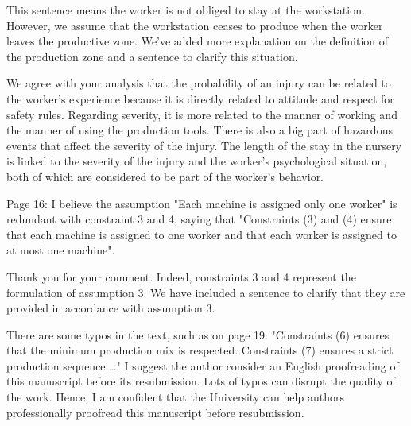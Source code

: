 \documentclass[preprint,11pt,3p]{elsarticle}
\begin{document}
\begin{tcolorbox}[colback=r_color1,colframe=r_color2,title=R5:]
This sentence means the worker is not obliged to stay at the workstation. However, we assume that the workstation ceases to produce when the worker leaves the productive zone. We've added more explanation on the definition of the production zone and a sentence to clarify this situation. 

We agree with your analysis that the probability of an injury can be related to the worker's experience because it is directly related to attitude and respect for safety rules. Regarding severity, it is more related to the manner of working and the manner of using the production tools. There is also a big part of hazardous events that affect the severity of the injury. The length of the stay in the nursery is linked to the severity of the injury and the worker's psychological situation, both of which are considered to be part of the worker's behavior.  


\end{tcolorbox}
\begin{tcolorbox}[colback=q_color1,colframe=q_color2,title=Q6  :] Page 16: I believe the assumption "Each machine is assigned only one worker" is redundant with constraint 3 and 4, saying that "Constraints (3) and (4) ensure that each machine is assigned to one worker and that each worker is assigned to at most one machine".
\end{tcolorbox}

\begin{tcolorbox}[colback=r_color1,colframe=r_color2,title=R6:]
Thank you for your comment. Indeed, constraints 3 and 4 represent the formulation of assumption 3. We have included a sentence to clarify that they are provided in accordance with assumption 3.

\end{tcolorbox}
\begin{tcolorbox}[colback=q_color1,colframe=q_color2,title=Q7  :] There are some typos in the text, such as on page 19: "Constraints (6) ensures that the minimum production mix is respected. Constraints (7) ensures a strict production sequence …" I suggest the author consider an English proofreading of this manuscript before its resubmission. Lots of typos can disrupt the quality of the work. Hence, I am confident that the University can help authors professionally proofread this manuscript before resubmission.
\end{tcolorbox}
\end{document}
